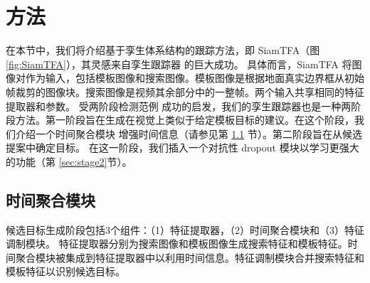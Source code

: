 \section{方法}
\label{sec:method}
在本节中，我们将介绍基于孪生体系结构的跟踪方法，即 SiamTFA（图 \ref{fig:SiamTFA}），其灵感来自孪生跟踪器 \cite{SiamRPN++, Wang2018SiamMask} 的巨大成功。
具体而言，SiamTFA 将图像对作为输入，包括模板图像和搜索图像。模板图像是根据地面真实边界框从初始帧裁剪的图像块。搜索图像是视频其余部分中的一整帧。两个输入共享相同的特征提取器和参数。
受两阶段检测范例 \cite{ren2015faster} 成功的启发，我们的孪生跟踪器也是一种两阶段方法。第一阶段旨在生成在视觉上类似于给定模板目标的建议。在这个阶段，我们介绍一个时间聚合模块
增强时间信息（请参见第 \ref{sec:stage1} 节）。第二阶段旨在从候选提案中确定目标。
在这一阶段，我们插入一个对抗性 dropout 模块以学习更强大的功能（第 \ref{sec:stage2}节）。

\subsection{时间聚合模块}
\label{sec:stage1}
候选目标生成阶段包括3个组件：（1）特征提取器，（2）时间聚合模块和（3）特征调制模块。
特征提取器分别为搜索图像和模板图像生成搜索特征和模板特征。时间聚合模块被集成到特征提取器中以利用时间信息。特征调制模块合并搜索特征和模板特征以识别候选目标。

